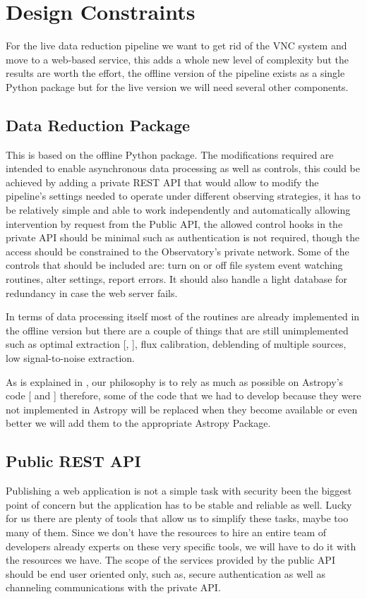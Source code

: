\documentclass[11pt,twoside]{article}
\begin{document}
\section{Design Constraints}

For the live data reduction pipeline we want to get rid of the VNC system and move to a web-based service, this adds a whole new level of complexity but the results are worth the effort, the offline version of the pipeline exists as a single Python package but for the live version  we will need several other components.

\subsection{Data Reduction Package}

This is based on the offline Python package. The modifications required are intended to enable asynchronous data processing as well as controls, this could be achieved by adding a private REST API that would allow to modify the pipeline's settings needed to operate under different observing strategies, it has to be relatively simple and able to work independently and automatically allowing intervention by request from the Public API, the allowed control hooks in the private API should be minimal such as authentication is not required, though the access should be constrained to the Observatory's private network. Some of the controls that should be included are: turn on or off file system event watching routines, alter settings, report errors. It should also handle a light database for redundancy in case the web server fails.

In terms of data processing itself most of the routines are already implemented in the offline version but there are a couple of things that are still unimplemented such as optimal extraction [\citet{1989PASP..101.1032M},  \citet{1986PASP...98..609H}], flux calibration, deblending of multiple sources, low signal-to-noise extraction.

As is explained in \citet{P9-115_adassxxvii}, our philosophy is to rely as much as possible on Astropy's code   [\citet{2013A&A...558A..33A} and \citet{2018AJ....156..123A}] therefore, some of the code that we had to develop because they were not implemented in Astropy will be replaced when they become available or even better we will add them to the appropriate Astropy Package.

\subsection{Public REST API}
Publishing a web application is not a simple task with security been the biggest point of concern but the application has to be stable and reliable as well. Lucky for us there are plenty of tools that allow us to simplify these tasks, maybe too many of them. Since we don't have the resources to hire an entire team of developers already experts on these very specific tools, we will have to do it with the resources we have. The scope of the services provided by the public API should be end user oriented only, such as, secure authentication as well as channeling communications with the private API.
\end{document}
